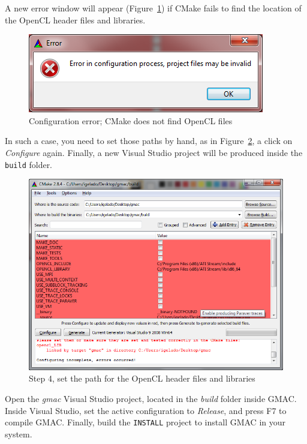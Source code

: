 A new error window will appear (Figure~\ref{fig:install:cmake-opencl-error}) if CMake fails to find 
the location of the OpenCL header files and libraries.
\begin{figure}[h]
\centering
\includegraphics[width=0.5\linewidth]{installation/figures/cmake-opencl-error}
\caption{Configuration error; CMake does not find OpenCL files}
\label{fig:install:cmake-opencl-error}
\end{figure}


In such a case, you need to set those paths by hand, as in 
Figure~\ref{fig:install:cmake-opencl-path}, a click on \emph{Configure} again. Finally, a new Visual 
Studio project will be produced inside the \texttt{build} folder.
\begin{figure}[h]
\centering
\includegraphics[width=0.8\linewidth]{installation/figures/cmake-opencl-path}
\caption{Step 4, set the path for the OpenCL header files and libraries}
\label{fig:install:cmake-opencl-path}
\end{figure}

Open the \emph{gmac} Visual Studio project, located in the \emph{build} folder inside GMAC\@. Inside 
Visual Studio, set the active configuration to \emph{Release}, and press F7 to compile GMAC\@.  
Finally, build the \texttt{INSTALL} project to install GMAC in your system.


